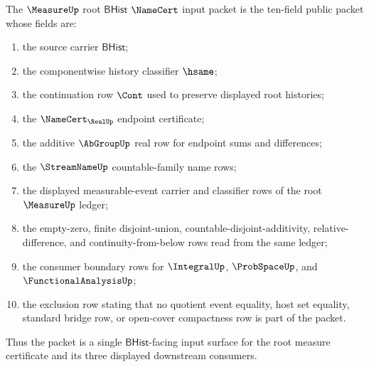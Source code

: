 \begin{definition}
\label{def:measure-root-bhist-namecert-input-packet}
The $\MeasureUp$ root $\mathsf{BHist}$ $\NameCert$ input packet is the
ten-field public packet whose fields are:
\begin{enumerate}
  \item the source carrier $\mathsf{BHist}$;
  \item the componentwise history classifier $\hsame$;
  \item the continuation row $\Cont$ used to preserve displayed root
  histories;
  \item the $\NameCert_{\RealUp}$ endpoint certificate;
  \item the additive $\AbGroupUp$ real row for endpoint sums and differences;
  \item the $\StreamNameUp$ countable-family name rows;
  \item the displayed measurable-event carrier and classifier rows of the
  root $\MeasureUp$ ledger;
  \item the empty-zero, finite disjoint-union, countable-disjoint-additivity,
  relative-difference, and continuity-from-below rows read from the same
  ledger;
  \item the consumer boundary rows for $\IntegralUp$, $\ProbSpaceUp$, and
  $\FunctionalAnalysisUp$;
  \item the exclusion row stating that no quotient event equality, host set
  equality, standard bridge row, or open-cover compactness row is part of the
  packet.
\end{enumerate}
Thus the packet is a single $\mathsf{BHist}$-facing input surface for the
root measure certificate and its three displayed downstream consumers.
\end{definition}

